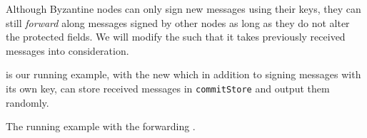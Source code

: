 Although Byzantine nodes can only sign new messages using their keys, they can still \emph{forward} along messages signed by other nodes as long as they do not alter the protected fields.
We will modify the \randomHarness{} such that it takes previously received messages into consideration.

 is our running example, with the new \randomHarness{} which in addition to signing messages with its own key, can store received messages in \texttt{commitStore} and output them randomly.

\begin{algorithm}
\caption{The running example with the forwarding \randomHarness{}.}
\label{alg:running-example-forwarding-harness}
\end{algorithm}

